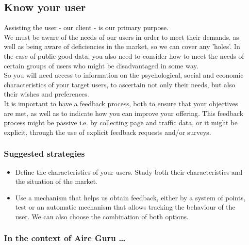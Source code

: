 \subsection{Know your user}

Assisting the user - our client - is our primary purpose. \\

We must be aware of the needs of our users in order to meet their demands, as well as being aware of deficiencies in the market, so we can cover any 'holes'.
In the case of public-good data, you also need to consider how to meet the needs of certain groups of users who might be disadvantaged in some way.\\


So you will need access to information on the psychological, social and economic characteristics of your target users, to ascertain not only
their needs, but also their wishes and preferences.\\

It is important to have a feedback process, both to ensure that your objectives are met, as well as to indicate how you can improve your offering.
This feedback process might be passive i.e. by collecting page and traffic data, or it might be explicit, through the use of explicit feedback requests
and/or surveys.\\

\subsubsection*{Suggested strategies} 

\begin{itemize}
    \item Define the characteristics of your users. Study both their characteristics and the situation of the
    market.
    \item Use a mechanism that helps us obtain feedback, either by a system of points, test or
    an automatic mechanism that allows tracking the behaviour of the user. We can also choose the combination of both
    options.
\end{itemize}

\subsubsection*{In the context of Aire Guru \ldots}

